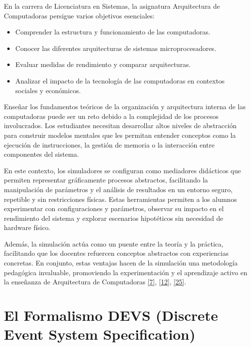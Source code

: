 \documentclass[12pt,oneside]{templates/unerthesis}
\begin{document}
En la carrera de Licenciatura en Sistemas, la asignatura Arquitectura de Computadoras persigue varios objetivos esenciales:

\begin{itemize}
\item
  Comprender la estructura y funcionamiento de las computadoras.
\item
  Conocer las diferentes arquitecturas de sistemas microprocesadores.
\item
  Evaluar medidas de rendimiento y comparar arquitecturas.
\item
  Analizar el impacto de la tecnología de las computadoras en contextos sociales y económicos.
\end{itemize}

Enseñar los fundamentos teóricos de la organización y arquitectura interna de las computadoras puede ser un reto debido a la complejidad de los procesos involucrados. Los estudiantes necesitan desarrollar altos niveles de abstracción para construir modelos mentales que les permitan entender conceptos como la ejecución de instrucciones, la gestión de memoria o la interacción entre componentes del sistema.

En este contexto, los simuladores se configuran como mediadores didácticos que permiten representar gráficamente procesos abstractos, facilitando la manipulación de parámetros y el análisis de resultados en un entorno seguro, repetible y sin restricciones físicas. Estas herramientas permiten a los alumnos experimentar con configuraciones y parámetros, observar su impacto en el rendimiento del sistema y explorar escenarios hipotéticos sin necesidad de hardware físico.

Además, la simulación actúa como un puente entre la teoría y la práctica, facilitando que los docentes refuercen conceptos abstractos con experiencias concretas. En conjunto, estas ventajas hacen de la simulación una metodología pedagógica invaluable, promoviendo la experimentación y el aprendizaje activo en la enseñanza de Arquitectura de Computadoras \protect\hyperlink{ref-garcia-garcia_pbbcache_2020}{{[}7{]}}, \protect\hyperlink{ref-nova_tool_2013}{{[}12{]}}, \protect\hyperlink{ref-skrien_cpu_2001}{{[}25{]}}.

\hypertarget{devs}{%
\section{El Formalismo DEVS (Discrete Event System Specification)}\label{devs}}
\end{document}
